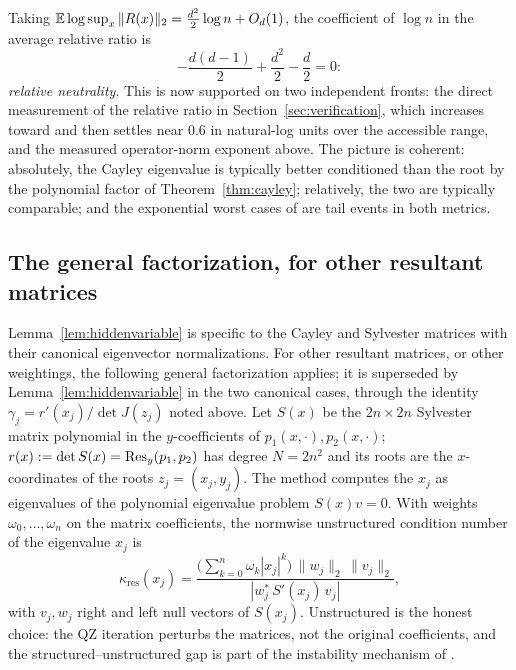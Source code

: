 Taking $\mathbb{E}\log\sup_x\|R(x)\|_2 = \frac{d^2}2\log n + O_d(1)$, the coefficient of $\log n$
in the average relative ratio is
\[
  -\frac{d(d-1)}2 + \frac{d^2}2 - \frac d2 = 0:
\]
\emph{relative neutrality}. This is now supported on two independent fronts: the direct
measurement of the relative ratio in Section~\ref{sec:verification}, which increases
toward and then settles near $0.6$ in natural-log units over the accessible range, and the
measured operator-norm exponent above. The picture is coherent: absolutely, the Cayley
eigenvalue is typically better conditioned than the root by the polynomial factor of
Theorem~\ref{thm:cayley}; relatively, the two are typically comparable; and the
exponential worst cases of \cite{noferini2016numerical} are tail events in both metrics.

\subsection{The general factorization, for other resultant matrices}

Lemma~\ref{lem:hiddenvariable} is specific to the Cayley and Sylvester matrices with their
canonical eigenvector normalizations. For other resultant matrices, or other weightings,
the following general factorization applies; it is superseded by
Lemma~\ref{lem:hiddenvariable} in the two canonical cases, through the identity
$\gamma_j = r'(x_j)/\det J(z_j)$ noted above. Let $S(x)$ be the $2n\times2n$ Sylvester
matrix polynomial in the $y$-coefficients of $p_1(x,\cdot),p_2(x,\cdot)$;
$r(x) := \det S(x) = \operatorname{Res}_y(p_1,p_2)$ has degree $N=2n^2$ and its roots are the
$x$-coordinates of the roots $z_j = (x_j,y_j)$. The method computes the $x_j$ as
eigenvalues of the polynomial eigenvalue problem $S(x)v = 0$. With weights
$\omega_0,\dots,\omega_n$ on the matrix coefficients, the normwise unstructured condition
number of the eigenvalue $x_j$ is \cite{tisseur2000backward}
\begin{equation}\label{eq:pep}
  \kappa_{\mathrm{res}}(x_j)
  = \frac{\bigl(\sum_{k=0}^n\omega_k|x_j|^k\bigr)\,\|w_j\|_2\,\|v_j\|_2}
  {|w_j^*\,S'(x_j)\,v_j|},
\end{equation}
with $v_j,w_j$ right and left null vectors of $S(x_j)$. Unstructured is the honest choice:
the QZ iteration perturbs the matrices, not the original coefficients, and the
structured--unstructured gap is part of the instability mechanism of
\cite{noferini2016numerical}.

